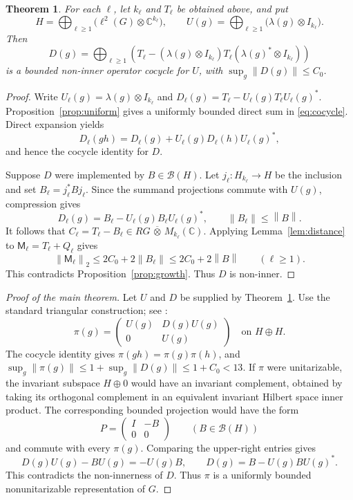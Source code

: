 \documentclass[a4paper,11pt]{amsproc}
\numberwithin{equation}{section}
\newtheorem{theorem}{Theorem}[section]
\theoremstyle{definition}
\newcommand{\C}{\mathbb C}
\newcommand{\cB}{\mathcal B}
\newcommand{\norm}[1]{\left\lVert#1\right\rVert}
\begin{document}
\begin{theorem}\label{thm:cocycle}
For each $\ell$, let $k_\ell$ and $T_\ell$ be obtained above, and put
\begin{equation}\label{eq:direct-sum}
 H=\bigoplus_{\ell\ge1}\bigl(\ell^2(G)\otimes\C^{k_\ell}\bigr),\qquad
 U(g)=\bigoplus_{\ell\ge1}\bigl(\lambda(g)\otimes I_{k_\ell}\bigr).
\end{equation}
Then
\begin{equation}\label{eq:cocycle}
 D(g)=\bigoplus_{\ell\ge1}
 \left(T_\ell-(\lambda(g)\otimes I_{k_\ell})T_\ell
                   (\lambda(g)^*\otimes I_{k_\ell})\right)
\end{equation}
is a bounded non-inner operator cocycle for $U$, with $\sup_g\norm{D(g)}\le C_0$.
\end{theorem}
\begin{proof}
Write $U_\ell(g)=\lambda(g)\otimes I_{k_\ell}$ and
$D_\ell(g)=T_\ell-U_\ell(g)T_\ell U_\ell(g)^*$. Proposition~\ref{prop:uniform} gives a uniformly bounded direct sum in \eqref{eq:cocycle}. Direct expansion yields
\[
 D_\ell(gh)=D_\ell(g)+U_\ell(g)D_\ell(h)U_\ell(g)^*,
\]
and hence the cocycle identity for $D$.

Suppose $D$ were implemented by $B\in\cB(H)$. Let $j_\ell:H_{k_\ell}\to H$ be the inclusion and set $B_\ell=j_\ell^*Bj_\ell$. Since the summand projections commute with $U(g)$, compression gives
\[
 D_\ell(g)=B_\ell-U_\ell(g)B_\ell U_\ell(g)^*,\qquad
 \norm{B_\ell}\le\norm{B}.
\]
It follows that $C_\ell=T_\ell-B_\ell\in RG\,\overline\otimes\,M_{k_\ell}(\C)$. Applying Lemma~\ref{lem:distance} to $\mathsf M_\ell=T_\ell+Q_\ell$ gives
\[
 \norm{\mathsf M_\ell}_2\le2C_0+2\norm{B_\ell}\le2C_0+2\norm{B}
 \qquad(\ell\ge1).
\]
This contradicts Proposition~\ref{prop:growth}. Thus $D$ is non-inner.
\end{proof}

\begin{proof}[Proof of the main theorem]
Let $U$ and $D$ be supplied by Theorem~\ref{thm:cocycle}. Use the standard triangular construction; see \cite[\S\,2]{mo}:
\begin{equation}\label{eq:triangular}
 \pi(g)=
 \begin{pmatrix}
 U(g)&D(g)U(g)\\
 0&U(g)
 \end{pmatrix}
 \quad\text{on }H\oplus H.
\end{equation}
The cocycle identity gives $\pi(gh)=\pi(g)\pi(h)$, and
$\sup_g\norm{\pi(g)}\le1+\sup_g\norm{D(g)}\le1+C_0<13$.
If $\pi$ were unitarizable, the invariant subspace $H\oplus0$ would have an invariant complement, obtained by taking its orthogonal complement in an equivalent invariant Hilbert space inner product. The corresponding bounded projection would have the form
\[
 P=\begin{pmatrix}I&-B\\0&0\end{pmatrix}
 \qquad(B\in\cB(H))
\]
and commute with every $\pi(g)$. Comparing the upper-right entries gives
\[
 D(g)U(g)-BU(g)=-U(g)B,
 \qquad D(g)=B-U(g)BU(g)^*.
\]
This contradicts the non-innerness of $D$. Thus $\pi$ is a uniformly bounded nonunitarizable representation of $G$.
\end{proof}
\end{document}
